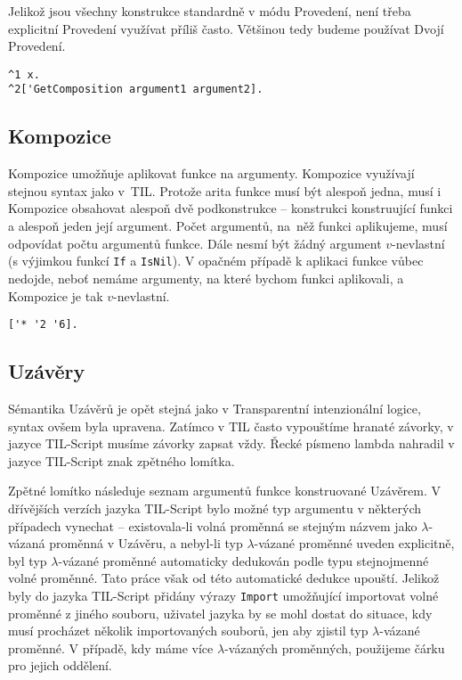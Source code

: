 Jelikož jsou všechny konstrukce standardně v módu Provedení, není třeba explicitní Provedení
využívat příliš často. Většinou tedy budeme používat Dvojí Provedení.

\begin{lstlisting}[caption={Příklad využití Provedení}]
^1 x.
^2['GetComposition argument1 argument2].
\end{lstlisting}

\subsection{Kompozice}

Kompozice umožňuje aplikovat funkce na argumenty. Kompozice využívají stejnou syntax jako v~TIL.
Protože arita funkce musí být alespoň jedna, musí i Kompozice obsahovat alespoň dvě podkonstrukce
-- konstrukci konstruující funkci a alespoň jeden její argument. Počet argumentů, na~něž funkci
aplikujeme, musí odpovídat počtu argumentů funkce. Dále nesmí být žádný argument $v$-nevlastní
(s výjimkou funkcí \lstinline{If} a \lstinline{IsNil}). V opačném případě k aplikaci funkce vůbec
nedojde, neboť nemáme argumenty, na které bychom funkci aplikovali, a Kompozice je tak
$v$-nevlastní.

\begin{lstlisting}[caption={Příklad využití Kompozice}]
['* '2 '6].
\end{lstlisting}

\subsection{Uzávěry}

Sémantika Uzávěrů je opět stejná jako v Transparentní intenzionální logice, syntax ovšem byla
upravena. Zatímco v TIL často vypouštíme hranaté závorky, v jazyce TIL-Script musíme závorky zapsat
vždy. Řecké písmeno lambda nahradil v jazyce TIL-Script znak zpětného lomítka.

Zpětné lomítko následuje seznam argumentů funkce konstruované Uzávěrem. V dřívějších verzích jazyka
TIL-Script bylo možné typ argumentu v některých případech vynechat -- existovala-li volná proměnná
se stejným názvem jako $\lambda$-vázaná proměnná v Uzávěru, a nebyl-li typ $\lambda$-vázané
proměnné uveden explicitně, byl typ $\lambda$-vázané proměnné automaticky dedukován podle typu
stejnojmenné volné proměnné. Tato práce však od této automatické dedukce upouští. Jelikož byly
do jazyka TIL-Script přidány výrazy \lstinline{Import} umožňující importovat volné proměnné z jiného
souboru, uživatel jazyka by se mohl dostat do situace, kdy musí procházet několik
importovaných souborů, jen aby zjistil typ $\lambda$-vázané proměnné. V případě, kdy máme více
$\lambda$-vázaných proměnných, použijeme čárku pro jejich oddělení.

